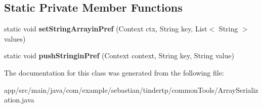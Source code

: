 \subsection*{Static Private Member Functions}
\begin{DoxyCompactItemize}
\item 
static void {\bfseries set\+String\+Arrayin\+Pref} (Context ctx, String key, List$<$ String $>$ values)\hypertarget{classcom_1_1example_1_1sebastian_1_1tindertp_1_1commonTools_1_1ArraySerialization_a5e7b7c56bf40ca5344db9806615e81ca}{}\label{classcom_1_1example_1_1sebastian_1_1tindertp_1_1commonTools_1_1ArraySerialization_a5e7b7c56bf40ca5344db9806615e81ca}

\item 
static void {\bfseries push\+Stringin\+Pref} (Context context, String key, String value)\hypertarget{classcom_1_1example_1_1sebastian_1_1tindertp_1_1commonTools_1_1ArraySerialization_a78eaa44f55be648142894e06f6ee089f}{}\label{classcom_1_1example_1_1sebastian_1_1tindertp_1_1commonTools_1_1ArraySerialization_a78eaa44f55be648142894e06f6ee089f}

\end{DoxyCompactItemize}


The documentation for this class was generated from the following file\+:\begin{DoxyCompactItemize}
\item 
app/src/main/java/com/example/sebastian/tindertp/common\+Tools/Array\+Serialization.\+java\end{DoxyCompactItemize}
